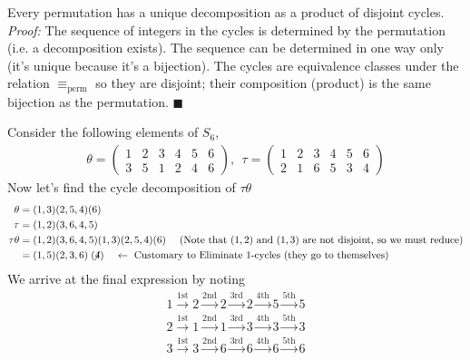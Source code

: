 \begin{lemma}
Every permutation has a unique decomposition as a product of disjoint cycles. \\
\textit{Proof:} The sequence of integers in the cycles is determined by the permutation (i.e. a
decomposition exists). The sequence can be determined in one way only (it's unique because it's a
bijection). The cycles are equivalence classes under the relation $\equiv_{\text{perm}}$ so they are
disjoint; their composition (product) is the same bijection as the permutation. $\blacksquare$
\end{lemma}
\begin{example}
Consider the following elements of $S_6$,
\begin{align}
    \theta= \begin{pmatrix}
    1&2&3&4&5&6 \\ 3&5&1&2&4&6
    \end{pmatrix}, \ \ \tau = \begin{pmatrix}
    1&2&3&4&5&6 \\ 2&1&6&5&3&4
    \end{pmatrix} \nonumber
\end{align}
Now let's find the cycle decomposition of $\tau \theta$
\begin{align}
    \theta &= (1,3)(2,5,4)(6)\nonumber \\
    \tau &= (1,2)(3,6,4,5) \nonumber \\
    \tau\theta &= (1,2)(3,6,4,5)(1,3)(2,5,4)(6) \ \ \ \ (\text{Note that }(1,2) \text{ and } (1,3) \text{ are not disjoint, so we must reduce)} \nonumber \\
    &=(1,5)(2,3,6)\centernot{{(4)}} \ \ \ \ \leftarrow \text{ Customary to Eliminate 1-cycles (they go to themselves)} \nonumber
\end{align}
We arrive at the final expression by noting
\begin{align}
    1 \overset{\text{1st}}{\rightarrow} 2 \overset{\text{2nd}}{\rightarrow} 2 \overset{\text{3rd}}{\rightarrow}2 \overset{\text{4th}}{\rightarrow}5 \overset{\text{5th}}{\rightarrow} 5 \nonumber \\
    2 \overset{\text{1st}}{\rightarrow} 1 \overset{\text{2nd}}{\rightarrow} 1 \overset{\text{3rd}}{\rightarrow}3 \overset{\text{4th}}{\rightarrow}3 \overset{\text{5th}}{\rightarrow}3 \nonumber \\
    3 \overset{\text{1st}}{\rightarrow} 3 \overset{\text{2nd}}{\rightarrow} 6 \overset{\text{3rd}}{\rightarrow}6 \overset{\text{4th}}{\rightarrow}6 \overset{\text{5th}}{\rightarrow}6 \nonumber \\

\end{align}
\end{example}
